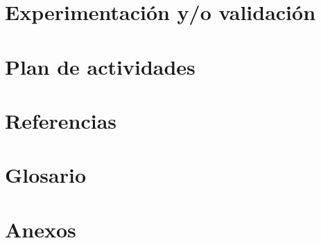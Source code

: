 \documentclass[a4paper,11pt]{article}
\begin{document}
\section{Experimentación y/o validación}

\newpage

\section{Plan de actividades}

\newpage

\section{Referencias}

\newpage

\section{Glosario}

\newpage

\section{Anexos}
\newpage
\end{document}
